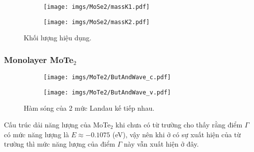 \documentclass{article}
\begin{document}
\begin{figure}[htb]
	\begin{subfigure}{0.495\textwidth}
		\centering
		\texttt{[image: imgs/MoSe2/massK1.pdf]}
	\end{subfigure}
	\begin{subfigure}{0.495\textwidth}
		\centering
		\texttt{[image: imgs/MoSe2/massK2.pdf]}
	\end{subfigure}
	\caption{Khối lượng hiệu dụng.}
\end{figure}

\newpage
\subsubsection*{Monolayer MoTe$_{2}$}
\begin{figure}[htb]
	\begin{subfigure}{0.495\textwidth}
		\centering
		\texttt{[image: imgs/MoTe2/ButAndWave\_c.pdf]}
	\end{subfigure}
	\begin{subfigure}{0.495\textwidth}
		\centering
		\texttt{[image: imgs/MoTe2/ButAndWave\_v.pdf]}
	\end{subfigure}
	\caption{Hàm sóng của 2 mức Landau kế tiếp nhau.}
\end{figure}
Cấu trúc dải năng lượng của MoTe$_{2}$ khi chưa có từ trường cho thấy rằng điểm $\Gamma$ có mức năng lượng là $E \approx -0.1075$ (eV), vậy nên khi ở có sự xuất hiện của từ trường thì mức năng lượng của điểm $\Gamma$ này vẫn xuất hiện ở đây. 
\end{document}
